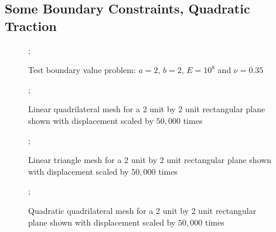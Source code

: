 \documentclass{article}
\begin{document}
\FloatBarrier
\subsection{Some Boundary Constraints,  Quadratic Traction}
\FloatBarrier

\begin{figure}
    ;
    \caption{Test boundary value problem: $a = 2$, $b = 2$, $E = 10^8$ and $\nu = 0.35$}
\centering
\end{figure}

\begin{figure}
    ;
    \caption{Linear quadrilateral mesh for a 2 unit by 2 unit rectangular plane shown with displacement scaled by $50,000$ times}
\centering
\end{figure}

\begin{figure}
    ;
    \caption{Linear triangle mesh for a 2 unit by 2 unit rectangular plane shown with displacement scaled by $50,000$ times}
\centering
\end{figure}

\begin{figure}
    ;
    \caption{Quadratic quadrilateral mesh for a 2 unit by 2 unit rectangular plane shown with displacement scaled by $50,000$ times}
\centering
\end{figure}
\end{document}

